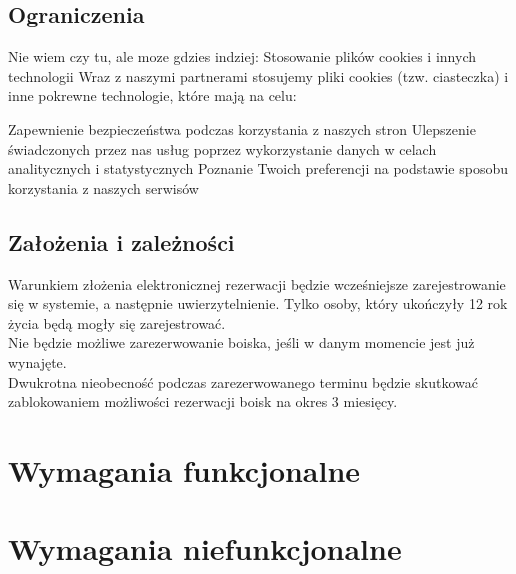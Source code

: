 \documentclass[a4paper, portrait,11pt]{article}
\begin{document}
\subsection {Ograniczenia}
Nie wiem czy tu, ale moze gdzies indziej:
Stosowanie plików cookies i innych technologii
Wraz z naszymi partnerami stosujemy pliki cookies (tzw. ciasteczka) i inne pokrewne technologie, które mają na celu:

    Zapewnienie bezpieczeństwa podczas korzystania z naszych stron
    Ulepszenie świadczonych przez nas usług poprzez wykorzystanie danych w celach analitycznych i statystycznych
    Poznanie Twoich preferencji na podstawie sposobu korzystania z naszych serwisów

\subsection {Założenia i zależności}
Warunkiem złożenia elektronicznej rezerwacji będzie wcześniejsze zarejestrowanie się w systemie, a następnie uwierzytelnienie. Tylko osoby, który ukończyły 12 rok życia będą mogły się zarejestrować. 
\\\indent Nie będzie możliwe zarezerwowanie boiska, jeśli w danym momencie jest już wynajęte.
\\\indent Dwukrotna nieobecność podczas zarezerwowanego terminu będzie skutkować zablokowaniem możliwości rezerwacji boisk na okres 3 miesięcy. 

\section {Wymagania funkcjonalne}


\section {Wymagania niefunkcjonalne}
\end{document}

